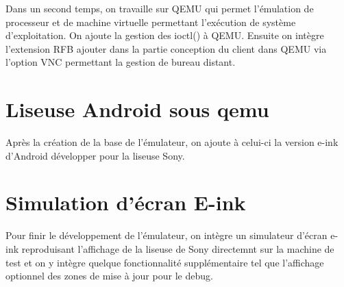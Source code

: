 Dans un second temps, on travaille sur QEMU qui permet l'émulation de processeur et de machine virtuelle permettant l'exécution de système d'exploitation. On ajoute la gestion des ioctl() à QEMU. Ensuite on intègre l'extension RFB ajouter dans la partie conception du client dans QEMU via l'option VNC permettant la gestion de bureau distant.

\section{Liseuse Android sous qemu}

Après la création de la base de l'émulateur, on ajoute à celui-ci la version e-ink d'Android développer pour la liseuse Sony. 

\section{Simulation d'écran E-ink}

Pour finir le développement de l'émulateur, on intègre un simulateur d'écran e-ink reproduisant l'affichage de la liseuse de Sony directemnt sur la machine de test et on y intègre quelque fonctionnalité supplémentaire tel que l'affichage optionnel des zones de mise à jour pour le debug.